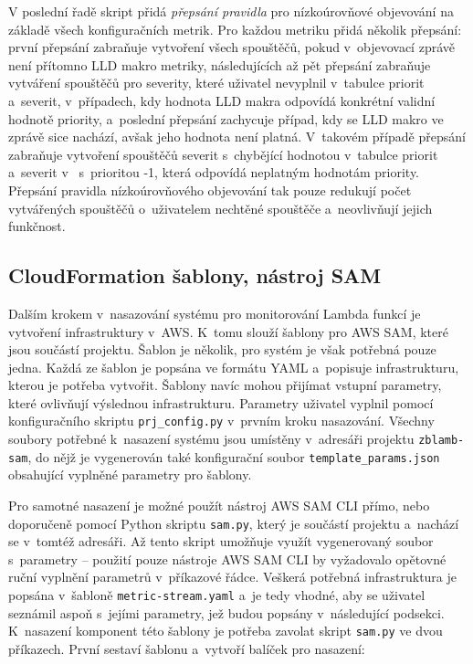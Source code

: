 \documentclass[czech, ing, kiv, he, iso690]{fasthesis}
\begin{document}
V poslední řadě skript přidá \emph{přepsání pravidla} pro nízkoúrovňové objevování na základě všech konfiguračních metrik. Pro každou metriku přidá několik přepsání: první přepsání zabraňuje vytvoření všech spouštěčů, pokud v~objevovací zprávě není přítomno LLD makro metriky, následujících až pět přepsání zabraňuje vytváření spouštěčů pro severity, které uživatel nevyplnil v~tabulce priorit a~severit, v~případech, kdy hodnota LLD makra odpovídá konkrétní validní hodnotě priority, a~poslední přepsání zachycuje případ, kdy se LLD makro ve zprávě sice nachází, avšak jeho hodnota není platná. V~takovém případě přepsání zabraňuje vytvoření spouštěčů severit s~chybějící hodnotou v~tabulce priorit a~severit v~ s~prioritou -1, která odpovídá neplatným hodnotám priority. Přepsání pravidla nízkoúrovňového objevování tak pouze redukují počet vytvářených spouštěčů o~uživatelem nechtěné spouštěče a~neovlivňují jejich funkčnost.

\subsection{CloudFormation šablony, nástroj SAM}

Dalším krokem v~nasazování systému pro monitorování Lambda funkcí je vytvoření infrastruktury v~AWS. K~tomu slouží šablony pro AWS SAM, které jsou součástí projektu. Šablon je několik, pro systém je však potřebná pouze jedna. Každá ze šablon je popsána ve formátu YAML a~popisuje infrastrukturu, kterou je potřeba vytvořit. Šablony navíc mohou přijímat vstupní parametry, které ovlivňují výslednou infrastrukturu. Parametry uživatel vyplnil pomocí konfiguračního skriptu \verb|prj_config.py| v~prvním kroku nasazování. Všechny soubory potřebné k~nasazení systému jsou umístěny v~adresáři projektu \verb|zblamb-sam|, do nějž je vygenerován také konfigurační soubor \verb|template_params.json| obsahující vyplněné parametry pro šablony. 

Pro samotné nasazení je možné použít nástroj AWS SAM CLI přímo, nebo doporučeně pomocí Python skriptu \verb|sam.py|, který je součástí projektu a~nachází se v~tomtéž adresáři. Až tento skript umožňuje využít vygenerovaný soubor s~parametry -- použití pouze nástroje AWS SAM CLI by vyžadovalo opětovné ruční vyplnění parametrů v~příkazové řádce. Veškerá potřebná infrastruktura je popsána v~šabloně \verb|metric-stream.yaml| a~je tedy vhodné, aby se uživatel seznámil aspoň s~jejími parametry, jež budou popsány v~následující podsekci. K~nasazení komponent této šablony je potřeba zavolat skript \verb|sam.py| ve dvou příkazech. První sestaví šablonu a~vytvoří balíček pro nasazení:
\end{document}
